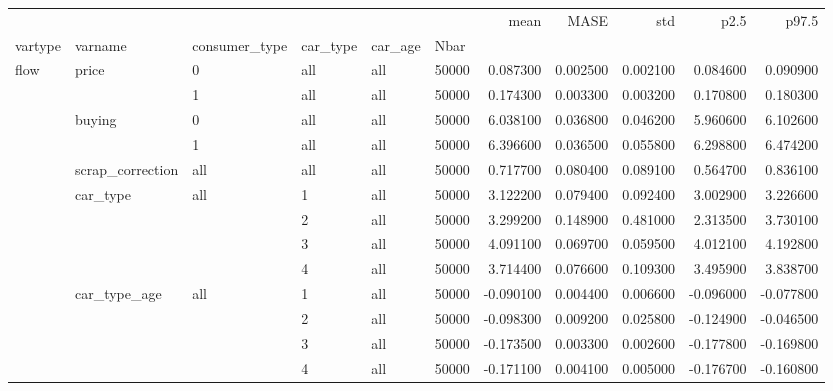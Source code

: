 \begin{tabular}{llllllrrrrr}
\toprule
 &  &  &  &  &  & mean & MASE & std & p2.5 & p97.5 \\
vartype & varname & consumer_type & car_type & car_age & Nbar &  &  &  &  &  \\
\midrule
\multirow[t]{13}{*}{flow} & \multirow[t]{2}{*}{price} & 0 & all & all & 50000 & 0.087300 & 0.002500 & 0.002100 & 0.084600 & 0.090900 \\
\cline{3-11} \cline{4-11} \cline{5-11}
 &  & 1 & all & all & 50000 & 0.174300 & 0.003300 & 0.003200 & 0.170800 & 0.180300 \\
\cline{2-11} \cline{3-11} \cline{4-11} \cline{5-11}
 & \multirow[t]{2}{*}{buying} & 0 & all & all & 50000 & 6.038100 & 0.036800 & 0.046200 & 5.960600 & 6.102600 \\
\cline{3-11} \cline{4-11} \cline{5-11}
 &  & 1 & all & all & 50000 & 6.396600 & 0.036500 & 0.055800 & 6.298800 & 6.474200 \\
\cline{2-11} \cline{3-11} \cline{4-11} \cline{5-11}
 & scrap_correction & all & all & all & 50000 & 0.717700 & 0.080400 & 0.089100 & 0.564700 & 0.836100 \\
\cline{2-11} \cline{3-11} \cline{4-11} \cline{5-11}
 & \multirow[t]{4}{*}{car_type} & \multirow[t]{4}{*}{all} & 1 & all & 50000 & 3.122200 & 0.079400 & 0.092400 & 3.002900 & 3.226600 \\
\cline{4-11} \cline{5-11}
 &  &  & 2 & all & 50000 & 3.299200 & 0.148900 & 0.481000 & 2.313500 & 3.730100 \\
\cline{4-11} \cline{5-11}
 &  &  & 3 & all & 50000 & 4.091100 & 0.069700 & 0.059500 & 4.012100 & 4.192800 \\
\cline{4-11} \cline{5-11}
 &  &  & 4 & all & 50000 & 3.714400 & 0.076600 & 0.109300 & 3.495900 & 3.838700 \\
\cline{2-11} \cline{3-11} \cline{4-11} \cline{5-11}
 & \multirow[t]{4}{*}{car_type_age} & \multirow[t]{4}{*}{all} & 1 & all & 50000 & -0.090100 & 0.004400 & 0.006600 & -0.096000 & -0.077800 \\
\cline{4-11} \cline{5-11}
 &  &  & 2 & all & 50000 & -0.098300 & 0.009200 & 0.025800 & -0.124900 & -0.046500 \\
\cline{4-11} \cline{5-11}
 &  &  & 3 & all & 50000 & -0.173500 & 0.003300 & 0.002600 & -0.177800 & -0.169800 \\
\cline{4-11} \cline{5-11}
 &  &  & 4 & all & 50000 & -0.171100 & 0.004100 & 0.005000 & -0.176700 & -0.160800 \\
\cline{1-11} \cline{2-11} \cline{3-11} \cline{4-11} \cline{5-11}

\end{tabular}
